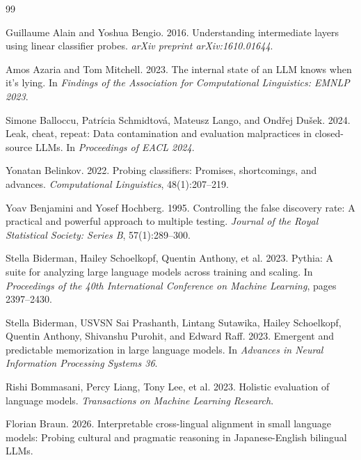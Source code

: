 \documentclass[10pt,twocolumn,letterpaper]{article}
\begin{document}
\begin{thebibliography}{99}
\footnotesize
\setlength{\itemsep}{0.2pt}
\setlength{\parsep}{0pt}

Guillaume Alain and Yoshua Bengio. 2016.
Understanding intermediate layers using linear classifier probes.
\emph{arXiv preprint arXiv:1610.01644}.

Amos Azaria and Tom Mitchell. 2023.
The internal state of an LLM knows when it's lying.
In \emph{Findings of the Association for Computational Linguistics: EMNLP 2023}.

Simone Balloccu, Patr\'icia Schmidtov\'a, Mateusz Lango, and Ond\v{r}ej Du\v{s}ek. 2024.
Leak, cheat, repeat: Data contamination and evaluation malpractices in closed-source LLMs.
In \emph{Proceedings of EACL 2024}.

Yonatan Belinkov. 2022.
Probing classifiers: Promises, shortcomings, and advances.
\emph{Computational Linguistics}, 48(1):207--219.

Yoav Benjamini and Yosef Hochberg. 1995.
Controlling the false discovery rate: A practical and powerful approach to multiple testing.
\emph{Journal of the Royal Statistical Society: Series B}, 57(1):289--300.

Stella Biderman, Hailey Schoelkopf, Quentin Anthony, et al. 2023.
Pythia: A suite for analyzing large language models across training and scaling.
In \emph{Proceedings of the 40th International Conference on Machine Learning}, pages 2397--2430.

Stella Biderman, USVSN Sai Prashanth, Lintang Sutawika, Hailey Schoelkopf, Quentin Anthony, Shivanshu Purohit, and Edward Raff. 2023.
Emergent and predictable memorization in large language models.
In \emph{Advances in Neural Information Processing Systems 36}.

Rishi Bommasani, Percy Liang, Tony Lee, et al. 2023.
Holistic evaluation of language models.
\emph{Transactions on Machine Learning Research}.

Florian Braun. 2026.
Interpretable cross-lingual alignment in small language models: Probing cultural and pragmatic reasoning in Japanese-English bilingual LLMs.


\end{thebibliography}
\end{document}
